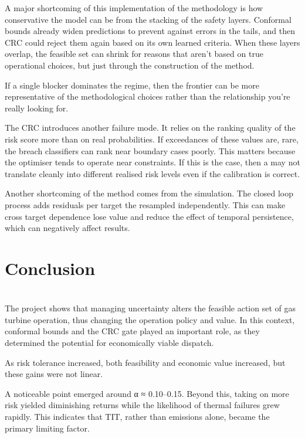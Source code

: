 \documentclass[11pt]{article}
\begin{document}
A major shortcoming of this implementation of the methodology is how
conservative the model can be from the stacking of the safety layers.
Conformal bounds already widen predictions to prevent against errors in
the tails, and then CRC could reject them again based on its own learned
criteria. When these layers overlap, the feasible set can shrink for
reasons that aren't based on true operational choices, but just through
the construction of the method.

If a single blocker dominates the regime, then the frontier can be more
representative of the methodological choices rather than the
relationship you're really looking for.

The CRC introduces another failure mode. It relies on the ranking
quality of the risk score more than on real probabilities. If
exceedances of these values are, rare, the breach classifiers can rank
near boundary cases poorly. This matters because the optimiser tends to
operate near constraints. If this is the case, then a may not translate
cleanly into different realised risk levels even if the calibration is
correct.

Another shortcoming of the method comes from the simulation. The closed
loop process adds residuals per target the resampled independently. This
can make cross target dependence lose value and reduce the effect of
temporal persistence, which can negatively affect results.

\section{Conclusion}\label{conclusion}

\section{}\label{section-15}

The project shows that managing uncertainty alters the feasible action
set of gas turbine operation, thus changing the operation policy and
value. In this context, conformal bounds and the CRC gate played an
important role, as they determined the potential for economically viable
dispatch.

As risk tolerance increased, both feasibility and economic value
increased, but these gains were not linear.

A noticeable point emerged around α ≈ 0.10--0.15. Beyond this, taking on
more risk yielded diminishing returns while the likelihood of thermal
failures grew rapidly. This indicates that TIT, rather than emissions
alone, became the primary limiting factor.
\end{document}
